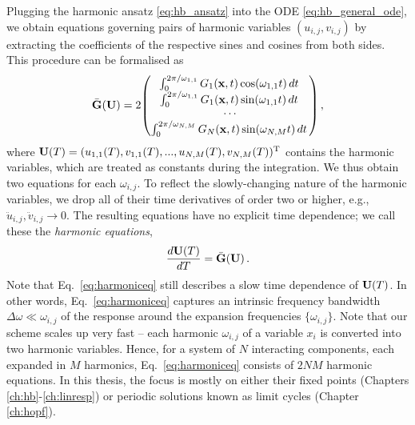 Plugging the harmonic ansatz \eqref{eq:hb_ansatz} into the ODE \eqref{eq:hb_general_ode}, we obtain equations governing pairs of harmonic variables $(u_{i,j}, v_{i,j})$ by extracting the coefficients of the respective sines and cosines from both sides. This procedure can be formalised as
\begin{equation} \label{eq:hb_int}
\bar{\vb{G}}(\vb{U}) = 2 \mqty( \int_0^{2\pi/\omega_{1,1}} G_1 ( \vb{x},t) \cos(\omega_{1,1} t) \,dt \,
\\  \int_0^{2\pi/\omega_{1,1}} G_1 ( \vb{x},t) \sin(\omega_{1,1} t)\, dt \,
\\ \cdots 
\\ \int_0^{2\pi/\omega_{N,M}} G_N ( \vb{x},t) \sin(\omega_{N,M} t)\, dt \,) \,,
\end{equation}
where $\vb{U}(T) = (u_{1,1}(T), v_{1,1}(T), ...,u_{N,M}(T), v_{N,M}(T))^{\text T}$ contains the harmonic variables, which are treated as constants during the integration.
We thus obtain two equations for each $\omega_{i,j}$. To reflect the slowly-changing nature of the harmonic variables, we drop all of their time derivatives of order two or higher, e.g., $\ddot{u}_{i,j}, \ddot{v}_{i,j}\rightarrow 0$. The resulting equations have no explicit time dependence; we call these the \textit{harmonic equations},
%
\begin{equation} \label{eq:harmoniceq}
\frac{d\vb{U}(T)}{dT}  = \bar{\vb{G}} (\vb{U})\,.
\end{equation}
%
Note that Eq.~\eqref{eq:harmoniceq} still describes a slow time dependence of $\vb{U}(T)$. In other words, Eq.~\eqref{eq:harmoniceq} captures an intrinsic frequency bandwidth $\Delta\omega \ll \omega_{i,j}$ of the response around the expansion frequencies $\{\omega_{i,j}\}$. Note that our scheme scales up very fast -- each harmonic $\omega_{i,j}$ of a variable $x_i$ is converted into two harmonic variables. Hence, for a system of $N$ interacting components, each expanded in $M$ harmonics, Eq.~\eqref{eq:harmoniceq} consists of $2 N M$ harmonic equations. In this thesis, the focus is mostly on either their fixed points (Chapters \ref{ch:hb}-\ref{ch:linresp}) or periodic solutions known as limit cycles (Chapter \ref{ch:hopf}). 

